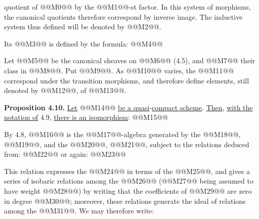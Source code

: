 quotient of @@M0@@ by the @@M1@@-st factor. In this system of morphisms, the canonical quotients therefore correspond by inverse image. The inductive system thus defined will be denoted by @@M2@@.

Its @@M3@@ is defined by the formula:
@@M4@@

Let @@M5@@ be the canonical sheaves on @@M6@@ (4.5), and @@M7@@ their class in @@M8@@. Put @@M9@@. As @@M10@@ varies, the @@M11@@ correspond under the transition morphisms, and therefore define elements, still denoted by @@M12@@, of @@M13@@.

\textbf{Proposition 4.10.} \uline{Let} @@M14@@ \uline{be a quasi}-\uline{compact scheme}. \uline{Then}, \uline{with the notation of} 4.9, \uline{there is an isomorphism}:
@@M15@@

By 4.8, @@M16@@ is the @@M17@@-algebra generated by the @@M18@@, @@M19@@, and the @@M20@@, @@M21@@, subject to the relations deduced from:
@@M22@@
or again:
@@M23@@

This relation expresses the @@M24@@ in terms of the @@M25@@, and gives a series of isobaric relations among the @@M26@@ (@@M27@@ being assumed to have weight @@M28@@) by writing that the coefficients of @@M29@@ are zero in degree @@M30@@; moreover, these relations generate the ideal of relations among the @@M31@@. We may therefore write:
